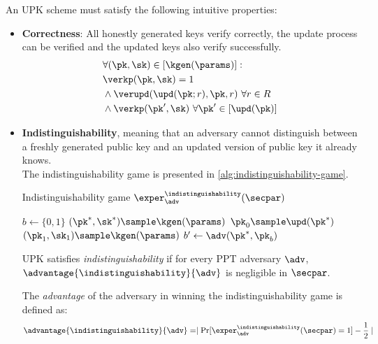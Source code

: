 An UPK scheme must satisfy the following intuitive properties:
\begin{itemize}
    \item \textbf{Correctness}: All honestly generated keys verify correctly, the update process can be verified and the updated keys also verify successfully.
    \begin{align*}
        & \forall (\pk,\sk) \in [\kgen(\params)]: \\
        & \verkp(\pk,\sk) = 1 \\
        & \land \verupd(\upd(\pk;r), \pk, r) \ \forall r\in R\\
        & \land \verkp(\pk',\sk) \ \forall \pk' \in [\upd(\pk)]
    \end{align*}

    \item \textbf{Indistinguishability}, meaning that an adversary cannot distinguish between a freshly generated public key and an updated version of public key it already knows. \\
    The indistinguishability game is presented in \autoref{alg:indistinguishability-game}.
    \begin{algorithm}[h!]
        \DontPrintSemicolon
        \SetAlgoLined
        \caption{Indistinguishability game $\exper^{\indistinguishability}_{\adv}(\secpar)$}
        \label{alg:indistinguishability-game}
        \Input{$\secpar$}
        \BlankLine
    
        $b\gets \{0, 1\}$ \;
        $(\pk^{*}, \sk^{*}) \sample \kgen(\params)$ \;
        $\pk_0 \sample \upd(\pk^{*})$ \;
        $(\pk_1, \sk_1) \sample \kgen(\params)$ \;
        $b' \gets \adv(\pk^{*}, \pk_b)$ \;
    \end{algorithm}    

    UPK satisfies \emph{indistinguishability} if for every PPT adversary $\adv$, $\advantage{\indistinguishability}{\adv}$ is negligible in  $\secpar$.
    
    The \emph{advantage} of the adversary in winning the indistinguishability game is defined as:
    \begin{equation*}
        \advantage{\indistinguishability}{\adv} = \mid \Pr[\exper^{\indistinguishability}_{\adv}(\secpar)=1] - \dfrac{1}{2} \mid
    \end{equation*}



\end{itemize}
